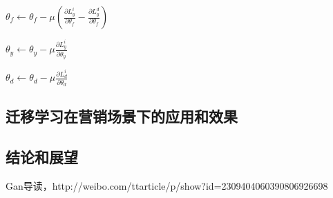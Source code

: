 $\theta_f \leftarrow \theta_f - \mu(\frac{\partial L_y^i}{\partial \theta_f} - \frac{\partial L_y^d}{\partial \theta_f})$

$\theta_y \leftarrow \theta_y - \mu\frac{\partial L_y^i}{\partial \theta_y}$

$\theta_d \leftarrow \theta_d - \mu\frac{\partial L_d^i}{\partial \theta_d}$



\subsection{迁移学习在营销场景下的应用和效果}

\subsection{结论和展望}

\begin{thebibliography}{99}
 Gan导读，http://weibo.com/ttarticle/p/show?id=2309404060390806926698
\end{thebibliography}

 
